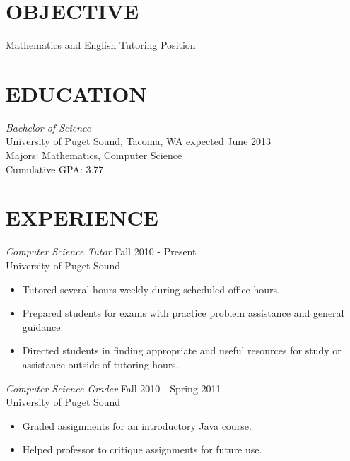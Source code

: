 \documentclass[line,margin,11pt]{res}
\begin{document}
\address{1311 N. Alder, Tacoma, WA 98406}
\address{(406) 546-9210, kwenholz@pugetsound.edu}

 
\begin{resume}
\vspace*{.15cm}
\section{OBJECTIVE} Mathematics and English Tutoring Position 
 
\section{EDUCATION} {\sl Bachelor of Science} \\
                University of Puget Sound, Tacoma, WA 
                expected June 2013 \\
                Majors: Mathematics, Computer Science \\
                Cumulative GPA: 3.77

\vspace*{.1cm}

 
\section{EXPERIENCE} 
{\sl Computer Science Tutor} \hfill 
    Fall 2010 - Present \\
        University of Puget Sound\\
        \begin{itemize}  
            \item Tutored several hours weekly during scheduled office hours.
            \item Prepared students for exams with practice problem assistance
              and general guidance.
            \item Directed students in finding appropriate and useful resources
              for study or assistance outside of tutoring hours.
        \end{itemize}

{\sl Computer Science Grader} \hfill 
    Fall 2010 - Spring 2011 \\
        University of Puget Sound\\
        \begin{itemize}  
            \item Graded assignments for an introductory Java course.
            \item Helped professor to critique assignments for future use.
        \end{itemize}
 

\end{resume}
\end{document}
